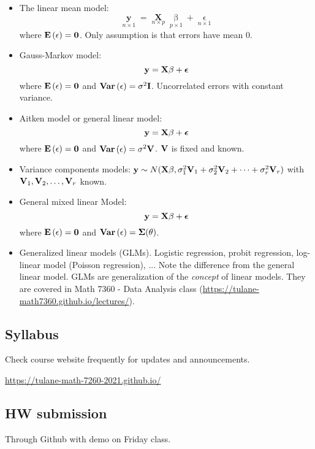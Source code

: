 \begin{itemize}
\item The linear mean model:
$$
\mathop \mathbf{y} \limits_{n \times 1} = \mathop \mathbf{X}\limits_{n \times p} \mathop \beta \limits_{p \times 1}+  \mathop \epsilon \limits_{n \times 1}
$$
where ${\mathbf{E}\left(\epsilon\right)} = \mathbf{0}$.  Only assumption is that errors have mean $0$.

\item Gauss-Markov model:
$$
\mathbf{y} = \mathbf{X}\beta + \boldsymbol{\epsilon}
$$
where ${\mathbf{E}\left(\mathbf{\epsilon}\right)} = \mathbf{0}$ and $\mathbf{Var}\left(\mathbf{\epsilon}\right) = \sigma^2 \mathbf{I}$.  Uncorrelated errors with constant variance.

\item Aitken model or general linear model:
$$
\mathbf{y} = \mathbf{X}\beta + \boldsymbol{\epsilon}
$$
where ${\mathbf{E}\left(\mathbf{\epsilon}\right)} = \mathbf{0}$ and $\mathbf{Var}\left(\mathbf{\epsilon}\right) = \sigma^2 \mathbf{V}$.  $\mathbf{V}$ is fixed and known.

\item Variance components models: $\mathbf{y} \sim N(\mathbf{X}\beta, \sigma^2_1\mathbf{V}_1 + \sigma^2_2\mathbf{V}_2 + \dots + \sigma^2_r\mathbf{V}_r)$ with $\mathbf{V}_1, \mathbf{V}_2, \dots, \mathbf{V}_r$ known.

\item General mixed linear Model:
$$
\mathbf{y} = \mathbf{X}\beta + \boldsymbol{\epsilon}
$$
where ${\mathbf{E}\left(\mathbf{\epsilon}\right)} = \mathbf{0}$ and $\mathbf{Var}\left(\mathbf{\epsilon}\right) = \boldsymbol{\Sigma}(\theta)$.

\item Generalized linear models (GLMs).  Logistic regression, probit regression, log-linear model (Poisson regression), ... Note the difference from the general linear model.  GLMs are generalization of the {\it concept} of linear models.  They are covered in Math 7360 - Data Analysis class (\href{https://tulane-math7360.github.io/lectures/}{https://tulane-math7360.github.io/lectures/}).

\end{itemize}

\subsection*{Syllabus}

Check course website frequently for updates and announcements.

\href{https://tulane-math-7260-2021.github.io/}{https://tulane-math-7260-2021.github.io/}

\subsection*{HW submission}

Through Github with demo on Friday class.




